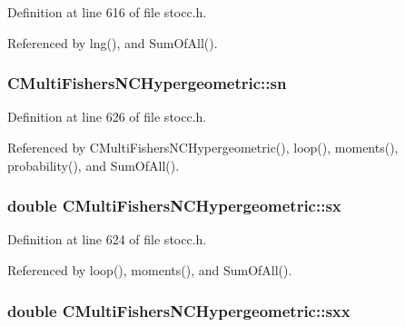 Definition at line 616 of file stocc.\-h.



Referenced by lng(), and Sum\-Of\-All().

\subsubsection[{sn}]{ C\-Multi\-Fishers\-N\-C\-Hypergeometric\-::sn\hspace{0.3cm}{\ttfamily [protected]}}\label{class_c_multi_fishers_n_c_hypergeometric_aed9a080cd61ead7230cf4ef6a0cb05e6}


Definition at line 626 of file stocc.\-h.



Referenced by C\-Multi\-Fishers\-N\-C\-Hypergeometric(), loop(), moments(), probability(), and Sum\-Of\-All().

\subsubsection[{sx}]{\setlength{\rightskip}{0pt plus 5cm}double C\-Multi\-Fishers\-N\-C\-Hypergeometric\-::sx\hspace{0.3cm}{\ttfamily [protected]}}\label{class_c_multi_fishers_n_c_hypergeometric_aa5595f5a5e97e2c124b89d78e46efbb6}


Definition at line 624 of file stocc.\-h.



Referenced by loop(), moments(), and Sum\-Of\-All().

\subsubsection[{sxx}]{\setlength{\rightskip}{0pt plus 5cm}double C\-Multi\-Fishers\-N\-C\-Hypergeometric\-::sxx\hspace{0.3cm}{\ttfamily [protected]}}\label{class_c_multi_fishers_n_c_hypergeometric_acd24be05b89588ca08f2c257c1f0ecde}


